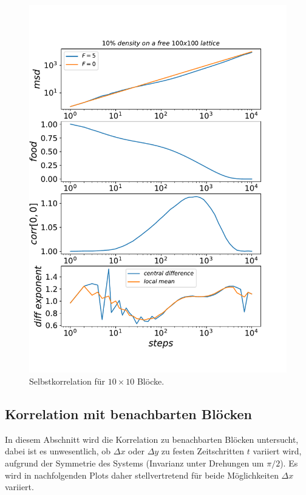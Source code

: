 \documentclass[a4paper, 12pt]{report}
\begin{document}
\begin{figure}[h!]
	\centering
	\includegraphics[scale=0.8]{corr1.pdf}
	\caption{Selbstkorrelation für $10\times 10$ Blöcke.}
\end{figure}

\newpage

\subsection{Korrelation mit benachbarten Blöcken}

In diesem Abschnitt wird die Korrelation zu benachbarten Blöcken untersucht, dabei ist es unwesentlich, ob $\Delta x$ oder $\Delta y$ zu festen Zeitschritten $t$ variiert wird, aufgrund der Symmetrie des Systems (Invarianz unter Drehungen um $\pi/2$). Es wird in nachfolgenden Plots daher stellvertretend für beide Möglichkeiten $\Delta x$ variiert.
\end{document}
